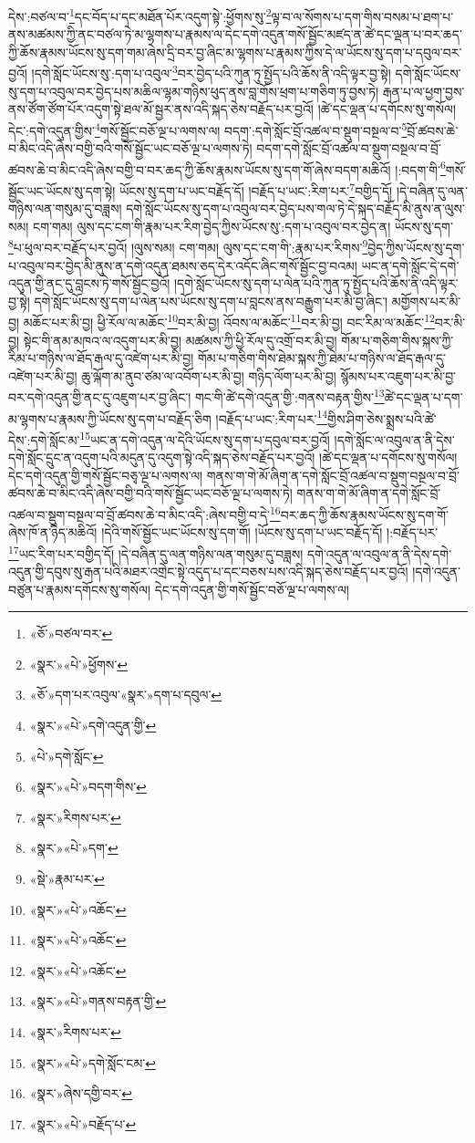 དེས་:བཙལ་བ་\footnote{«ཅོ་»བཙལ་བར་}དང་བོད་པ་དང་མཐོན་པོར་འདུག་སྟེ་:ཕྱོགས་སུ་\footnote{«སྣར་»«པེ་»ཕྱོགས་}ལྟ་བ་ལ་སོགས་པ་དག་གིས་བསམ་པ་ཐག་པ་ནས་མཚམས་ཀྱི་ནང་བཙལ་ཏེ་མ་ལྷགས་པ་རྣམས་ལ་དེང་དགེ་འདུན་གསོ་སྦྱོང་མཛད་ན་ཚེ་དང་ལྡན་པ་བར་ཆད་ཀྱི་ཆོས་རྣམས་ཡོངས་སུ་དག་གམ་ཞེས་དྲི་བར་བྱ་ཞིང་མ་ལྷགས་པ་རྣམས་ཀྱིས་དེ་ལ་ཡོངས་སུ་དག་པ་དབུལ་བར་བྱའོ། །དགེ་སློང་ཡོངས་སུ་:དག་པ་འབུལ་\footnote{«ཅོ་»དག་པར་འབུལ་«སྣར་»དག་པ་དབུལ་}བར་བྱེད་པའི་ཀུན་ཏུ་སྤྱོད་པའི་ཆོས་ནི་འདི་ལྟར་བྱ་སྟེ། དགེ་སློང་ཡོངས་སུ་དག་པ་འབུལ་བར་བྱེད་པས་མཆིལ་ལྷམ་གཉིས་ཕུད་ནས་བླ་གོས་ཕྲག་པ་གཅིག་ཏུ་བྱས་ཏེ། རྒན་པ་ལ་ཕྱག་བྱས་ནས་ཙོག་ཙོག་པོར་འདུག་སྟེ་ཐལ་མོ་སྦྱར་ནས་འདི་སྐད་ཅེས་བརྗོད་པར་བྱའོ། །ཚེ་དང་ལྡན་པ་དགོངས་སུ་གསོལ། དེང་:དགེ་འདུན་གྱིས་\footnote{«སྣར་»«པེ་»དགེ་འདུན་གྱི་}གསོ་སྦྱོང་བཅོ་ལྔ་པ་ལགས་ལ། བདག་:དགེ་སློང་བྲོ་འཚལ་བ་སྡུག་བསྔལ་བ་\footnote{«པེ་»དགེ་སློང་}བྲོ་ཚབས་ཆེ་བ་མིང་འདི་ཞེས་བགྱི་བའི་གསོ་སྦྱོང་ཡང་བཅོ་ལྔ་པ་ལགས་ཏེ། བདག་དགེ་སློང་བྲོ་འཚལ་བ་སྡུག་བསྔལ་བ་བྲོ་ཚབས་ཆེ་བ་མིང་འདི་ཞེས་བགྱི་བ་བར་ཆད་ཀྱི་ཆོས་རྣམས་ཡོངས་སུ་དག་གོ་ཞེས་བདག་མཆིའོ། །:བདག་གི་\footnote{«སྣར་»«པེ་»བདག་གིས་}གསོ་སྦྱོང་ཡང་ཡོངས་སུ་དག་སྟེ། ཡོངས་སུ་དག་པ་ཡང་བརྗོད་དོ། །བརྗོད་པ་ཡང་:རིག་པར་\footnote{«སྣར་»རིགས་པར་}བགྱིད་དོ། །དེ་བཞིན་དུ་ལན་གཉིས་ལན་གསུམ་དུ་བཟླས། དགེ་སློང་ཡོངས་སུ་དག་པ་འབུལ་བར་བྱེད་པས་གལ་ཏེ་དེ་སྐད་བརྗོད་མི་ནུས་ན་ལུས་སམ། ངག་གམ། ལུས་དང་ངག་གི་རྣམ་པར་རིག་བྱེད་ཀྱིས་ཡོངས་སུ་:དག་པ་འབུལ་བར་བྱེད་ན། ཡོངས་སུ་དག་\footnote{«སྣར་»«པེ་»དག་}པ་ཕུལ་བར་བརྗོད་པར་བྱའོ། །ལུས་སམ། ངག་གམ། ལུས་དང་ངག་གི་:རྣམ་པར་རིགས་\footnote{«སྡེ་»རྣམ་པར་}བྱེད་ཀྱིས་ཡོངས་སུ་དག་པ་འབུལ་བར་བྱེད་མི་ནུས་ན་དགེ་འདུན་ཐམས་ཅད་དེར་འདོང་ཞིང་གསོ་སྦྱོང་བྱ་བའམ། ཡང་ན་དགེ་སློང་དེ་དགེ་འདུན་གྱི་ནང་དུ་བླངས་ཏེ་གསོ་སྦྱོང་བྱའོ། །དགེ་སློང་ཡོངས་སུ་དག་པ་ལེན་པའི་ཀུན་ཏུ་སྤྱོད་པའི་ཆོས་ནི་འདི་ལྟར་བྱ་སྟེ། དགེ་སློང་ཡོངས་སུ་དག་པ་ལེན་པས་ཡོངས་སུ་དག་པ་བླངས་ནས་བརྒྱུག་པར་མི་བྱ་ཞིང་། མགྱོགས་པར་མི་བྱ། མཆོང་པར་མི་བྱ། ཕྱི་རོལ་ལ་མཆོང་\footnote{«སྣར་»«པེ་»འཆོང་}བར་མི་བྱ། འོབས་ལ་མཆོང་\footnote{«སྣར་»«པེ་»འཆོང་}བར་མི་བྱ། བང་རིམ་ལ་མཆོང་\footnote{«སྣར་»«པེ་»འཆོང་}བར་མི་བྱ། སྟེང་གི་ནམ་མཁའ་ལ་འདུག་པར་མི་བྱ། མཚམས་ཀྱི་ཕྱི་རོལ་དུ་འགྲོ་བར་མི་བྱ། གོམ་པ་གཅིག་གིས་སྐས་ཀྱི་རིམ་པ་གཉིས་ལ་ཐོད་རྒལ་དུ་འཛེག་པར་མི་བྱ། གོམ་པ་གཅིག་གིས་ཐེམ་སྐས་ཀྱི་ཐེམ་པ་གཉིས་ལ་ཐོད་རྒལ་དུ་འཛེག་པར་མི་བྱ། ཆུ་ལྐོག་མ་ནུབ་ཙམ་ལ་འབོག་པར་མི་བྱ། གཉིད་ལོག་པར་མི་བྱ། སྙོམས་པར་འཇུག་པར་མི་བྱ་བར་དགེ་འདུན་གྱི་ནང་དུ་འཇུག་པར་བྱ་ཞིང་། གང་གི་ཚེ་དགེ་འདུན་གྱི་:གནས་བརྟན་གྱིས་\footnote{«སྣར་»«པེ་»གནས་བརྟན་གྱི་}ཚེ་དང་ལྡན་པ་དག་མ་ལྷགས་པ་རྣམས་ཀྱི་ཡོངས་སུ་དག་པ་བརྗོད་ཅིག །བརྗོད་པ་ཡང་:རིག་པར་\footnote{«སྣར་»རིགས་པར་}གྱིས་ཤིག་ཅེས་སྨྲས་པའི་ཚེ་དེས་:དགེ་སློང་མ་\footnote{«སྣར་»«པེ་»དགེ་སློང་ངམ་}ཡང་ན་དགེ་འདུན་ལ་དེའི་ཡོངས་སུ་དག་པ་དབུལ་བར་བྱའོ། །དགེ་སློང་ལ་འབུལ་ན་ནི་དེས་དགེ་སློང་དྲུང་ན་འདུག་པའི་མདུན་དུ་འདུག་སྟེ་འདི་སྐད་ཅེས་བརྗོད་པར་བྱའོ། །ཚེ་དང་ལྡན་པ་དགོངས་སུ་གསོལ། དེང་དགེ་འདུན་གྱི་གསོ་སྦྱོང་བཅྭ་ལྔ་པ་ལགས་ལ། གནས་ག་གེ་མོ་ཞིག་ན་དགེ་སློང་བྲོ་འཚལ་བ་སྡུག་བསྔལ་བ་བྲོ་ཚབས་ཆེ་བ་མིང་འདི་ཞེས་བགྱི་བའི་གསོ་སྦྱོང་ཡང་བཅོ་ལྔ་པ་ལགས་ཏེ། གནས་ག་གེ་མོ་ཞིག་ན་དགེ་སློང་བྲོ་འཚལ་བ་སྡུག་བསྔལ་བ་བྲོ་ཚབས་ཆེ་བ་མིང་འདི་:ཞེས་བགྱི་བ་དེ་\footnote{«སྣར་»ཞེས་དགྱི་བར་}བར་ཆད་ཀྱི་ཆོས་རྣམས་ཡོངས་སུ་དག་གོ་ཞེས་ཁོ་ན་ཉིད་མཆིའོ། །དེའི་གསོ་སྦྱོང་ཡང་ཡོངས་སུ་དག་གོ། །ཡོངས་སུ་དག་པ་ཡང་བརྗོད་དོ། །:བརྗོད་པར་\footnote{«སྣར་»«པེ་»བརྗོད་པ་}ཡང་རིག་པར་བགྱིད་དོ། །དེ་བཞིན་དུ་ལན་གཉིས་ལན་གསུམ་དུ་བཟླས། དགེ་འདུན་ལ་འབུལ་ན་ནི་དེས་དགེ་འདུན་གྱི་དབུས་སུ་རྒན་པའི་མཐར་འགྲེང་སྟེ་འདུད་པ་དང་བཅས་པས་འདི་སྐད་ཅེས་བརྗོད་པར་བྱའོ། །དགེ་འདུན་བཙུན་པ་རྣམས་དགོངས་སུ་གསོལ། དེང་དགེ་འདུན་གྱི་གསོ་སྦྱོང་བཅོ་ལྔ་པ་ལགས་ལ། 